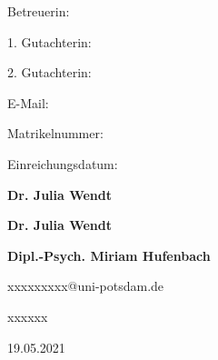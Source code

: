 \begin{titlepage}
\begin{center}
\begin{center}
						
					\end{center}    

			\vfill

				\begin{minipage}[t]{14cm}
							\begin{minipage}[t]{4.5cm}
									Betreuerin:
									
									1. Gutachterin: 
									
									2. Gutachterin:\vspace{0.5cm} 
									
									
									E-Mail:
									
									Matrikelnummer:
									
									Einreichungsdatum:
							\end{minipage}
							\begin{minipage}[t]{9cm} 
									\textbf{Dr. Julia Wendt}
									
									\textbf{Dr. Julia Wendt}
									
									\textbf{Dipl.-Psych. Miriam Hufenbach}\vspace{0.5cm}
									
									xxxxxxxxx@uni-potsdam.de 			%
									
									xxxxxx 							%
									
									19.05.2021							%
							\end{minipage} 
				\end{minipage}

			\vspace*{1cm}
	\end{center}

\end{titlepage}